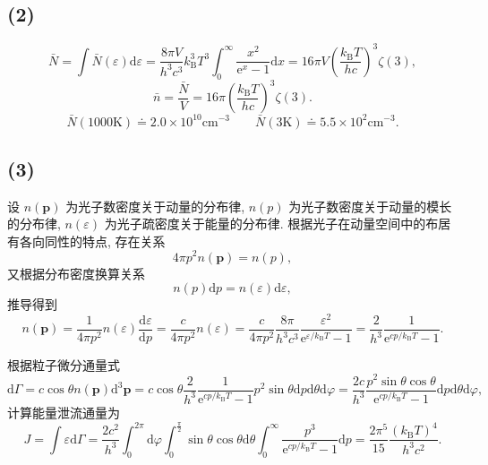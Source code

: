\documentclass[
    lang=cn,
    column=onecolumn
]{spArticle}
\begin{document}
        \subsection{(2)}
            $$
            \bar{N}=\int{\bar{N}\left( \varepsilon \right) \mathrm{d}\varepsilon}=\frac{8\pi V}{h^3c^3}k_{\mathrm{B}}^{3}T^3\int_0^{\infty}{\frac{x^2}{\mathrm{e}^x-1}\mathrm{d}x}=16\pi V\left( \frac{k_{\mathrm{B}}T}{hc} \right) ^3\zeta \left( 3 \right) ,
            $$
            $$
            \bar{n}=\frac{\bar{N}}{V}=16\pi \left( \frac{k_{\mathrm{B}}T}{hc} \right) ^3\zeta \left( 3 \right).
            $$
            $$
            \bar{N}\left( 1000\mathrm{K} \right) \doteq 2.0\times 10^{10}\mathrm{cm}^{-3}
            \qquad
            \bar{N}\left( 3\mathrm{K} \right) \doteq 5.5\times 10^2\mathrm{cm}^{-3}.
            $$
        \subsection{(3)}
            设 $n\left( \boldsymbol{p} \right) $ 为光子数密度关于动量的分布律, $n\left( p \right) $ 为光子数密度关于动量的模长的分布律, $n\left( \varepsilon \right) $ 为光子疏密度关于能量的分布律. 根据光子在动量空间中的布居有各向同性的特点, 存在关系
            $$
            4\pi p^2n\left( \boldsymbol{p} \right) =n\left( p \right) ,
            $$
            又根据分布密度换算关系
            $$
            n\left( p \right) \mathrm{d}p=n\left( \varepsilon \right) \mathrm{d}\varepsilon ,
            $$
            推导得到
            $$
            n\left( \boldsymbol{p} \right) =\frac{1}{4\pi p^2}n\left( \varepsilon \right) \frac{\mathrm{d}\varepsilon}{\mathrm{d}p}=\frac{c}{4\pi p^2}n\left( \varepsilon \right) =\frac{c}{4\pi p^2}\frac{8\pi}{h^3c^3}\frac{\varepsilon ^2}{\mathrm{e}^{\varepsilon /k_{\mathrm{B}}T}-1}=\frac{2}{h^3}\frac{1}{\mathrm{e}^{cp/k_{\mathrm{B}}T}-1}.
            $$

            根据粒子微分通量式
            $$
            \mathrm{d}\varGamma =c\cos \theta n\left( \boldsymbol{p} \right) \mathrm{d}^3\boldsymbol{p}=c\cos \theta \frac{2}{h^3}\frac{1}{\mathrm{e}^{cp/k_{\mathrm{B}}T}-1}p^2\sin \theta \mathrm{d}p\mathrm{d}\theta \mathrm{d}\varphi =\frac{2c}{h^3}\frac{p^2\sin \theta \cos \theta}{\mathrm{e}^{cp/k_{\mathrm{B}}T}-1}\mathrm{d}p\mathrm{d}\theta \mathrm{d}\varphi ,
            $$
            计算能量泄流通量为
            $$
            J=\int{\varepsilon \mathrm{d}\varGamma}=\frac{2c^2}{h^3}\int_0^{2\pi}{\mathrm{d}\varphi \int_0^{\frac{\pi}{2}}{\sin \theta \cos \theta \mathrm{d}\theta \int_0^{\infty}{\frac{p^3}{\mathrm{e}^{cp/k_{\mathrm{B}}T}-1}\mathrm{d}p}}}=\frac{2\pi ^5}{15}\frac{\left( k_{\mathrm{B}}T \right) ^4}{h^3c^2}.
            $$
\end{document}
